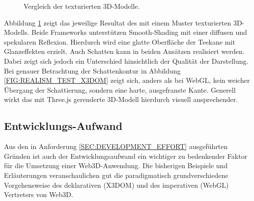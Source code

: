 \begin{figure}[!h]
	\centering
	\hfill
	\caption{Vergleich der texturierten 3D-Modelle.}
	\label{FIG:REALISM_TEST}
\end{figure}

Abbildung \ref{FIG:REALISM_TEST} zeigt das jeweilige Resultat des mit einem Muster texturierten 3D-Modells. Beide Frameworks unterstützen Smooth-Shading mit einer diffusen und spekularen Reflexion. Hierdurch wird eine glatte Oberfläche der Teekane mit Glanzeffekten erzielt. Auch Schatten kann in beiden Ansätzen realisiert werden. Dabei zeigt sich jedoch ein Unterschied hinsichtlich der Qualität der Darstellung. Bei genauer Betrachtung der Schattenkontur in Abbildung \ref{FIG:REALISM_TEST_X3DOM} zeigt sich, anders als bei WebGL, kein weicher Übergang der Schattierung, sondern eine harte, ausgefranste Kante. Generell wirkt das mit Three.js gerenderte 3D-Modell hierdurch visuell ansprechender.

\subsection{Entwicklungs-Aufwand}

Aus den in Anforderung \ref{SEC:DEVELOPMENT_EFFORT} ausgeführten Gründen ist auch der Entwicklungsaufwand ein wichtiger zu bedenkender Faktor für die Umsetzung einer Web3D-Anwendung. Die bisherigen Beispiele und Erläuterungen veranschaulichen gut die paradigmatisch grundverschiedene Vorgehensweise des deklarativen (X3DOM) und des imperativen (WebGL) Vertreters von Web3D.

